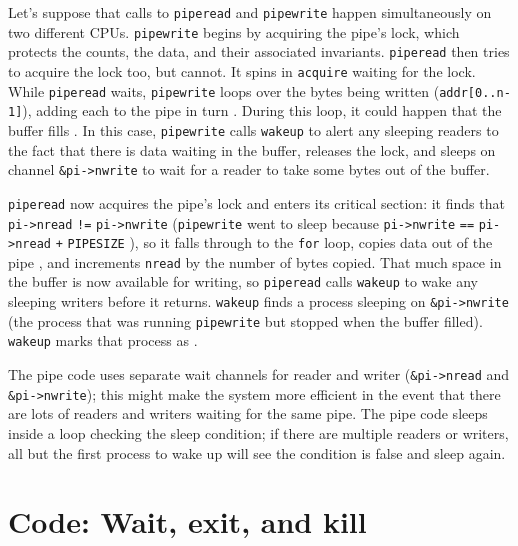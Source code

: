 Let's suppose that calls to
\lstinline{piperead}
and
\lstinline{pipewrite}
happen simultaneously on two different CPUs.
\lstinline{pipewrite}
begins by acquiring the pipe's lock, which
protects the counts, the data, and their
associated invariants.
\lstinline{piperead}
then tries to acquire the lock too, but cannot.
It spins in
\lstinline{acquire}
waiting for the lock.
While
\lstinline{piperead}
waits,
\lstinline{pipewrite}
loops over the bytes being written
(\lstinline{addr[0..n-1]}),
adding each to the pipe in turn
.
During this loop, it could happen that
the buffer fills
.
In this case, 
\lstinline{pipewrite}
calls
\lstinline{wakeup}
to alert any sleeping readers to the fact
that there is data waiting in the buffer,
releases the lock,
and sleeps on channel
\lstinline{&pi->nwrite}
to wait for a reader to take some bytes
out of the buffer.

\lstinline{piperead}
now acquires the pipe's lock and enters its critical section:
it finds that
\lstinline{pi->nread}
\lstinline{!=}
\lstinline{pi->nwrite}
(\lstinline{pipewrite}
went to sleep because
\lstinline{pi->nwrite}
\lstinline{==}
\lstinline{pi->nread}
\lstinline{+}
\lstinline{PIPESIZE}
),
so it falls through to the 
\lstinline{for}
loop, copies data out of the pipe
,
and increments 
\lstinline{nread}
by the number of bytes copied.
That much space in the buffer is now available for writing, so
\lstinline{piperead}
calls
\lstinline{wakeup}
to wake any sleeping writers
before it returns.
\lstinline{wakeup}
finds a process sleeping on
\lstinline{&pi->nwrite}
(the process that was running
\lstinline{pipewrite}
but stopped when the buffer filled).
\lstinline{wakeup} marks that process as
.

The pipe code uses separate wait channels for reader and writer
(\lstinline{&pi->nread}
and
\lstinline{&pi->nwrite});
this might make the system more efficient in the 
event that there are lots of
readers and writers waiting for the same pipe.
The pipe code sleeps inside a loop checking the
sleep condition; if there are multiple readers
or writers, all but the first process to wake up
will see the condition is false and sleep again.
\section{Code: Wait, exit, and kill}

